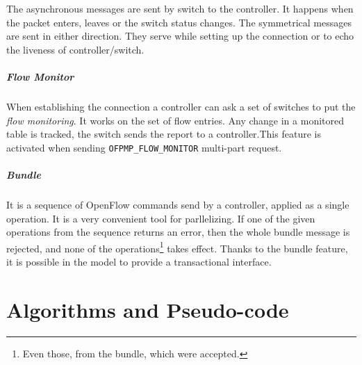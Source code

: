 \documentclass{article}
\theoremstyle{remark}
\begin{document}
The asynchronous messages are sent by switch to the controller. It happens when the packet enters, leaves or the switch status changes.  The symmetrical messages are sent in either direction. They serve while setting up the connection or to echo the liveness of controller/switch. 
\subparagraph{Flow Monitor}  When establishing the connection a controller can ask a set of switches to put the \emph{flow monitoring}. It works on the set of flow entries. Any change in a monitored table is tracked, the switch sends the report to a controller.This feature is activated when sending 
\texttt{OFPMP\_FLOW\_MONITOR} multi-part request.  
\subparagraph{Bundle} It is a sequence of OpenFlow commands send by a controller, applied as a single operation. It is a very convenient tool for parllelizing. If one of the given operations from the sequence returns an error, then the whole bundle message is rejected, and none of the operations\footnote{Even those, from the bundle, which were accepted.} takes effect. 
Thanks to the bundle feature, it is possible in the model to provide a transactional interface.

\section{Algorithms and Pseudo-code}
\end{document}
